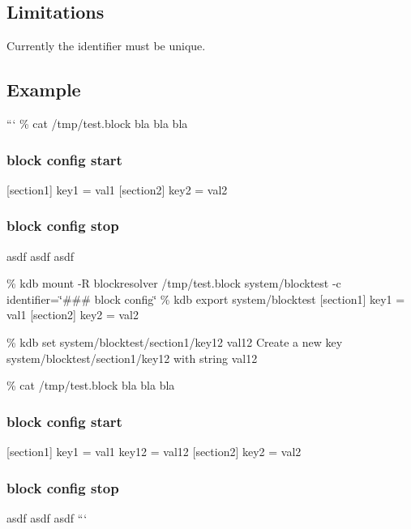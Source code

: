\subsection*{Limitations}

Currently the identifier must be unique.

\subsection*{Example}

``` \% cat /tmp/test.block bla bla bla \subsubsection*{block config start}

\mbox{[}section1\mbox{]} key1 = val1 \mbox{[}section2\mbox{]} key2 = val2 \subsubsection*{block config stop}

asdf asdf asdf

\% kdb mount -\/\+R blockresolver /tmp/test.block system/blocktest -\/c identifier=\char`\"{}\#\#\# block config\char`\"{} \% kdb export system/blocktest \mbox{[}section1\mbox{]} key1 = val1 \mbox{[}section2\mbox{]} key2 = val2

\% kdb set system/blocktest/section1/key12 val12 Create a new key system/blocktest/section1/key12 with string val12

\% cat /tmp/test.block bla bla bla \subsubsection*{block config start}

\mbox{[}section1\mbox{]} key1 = val1 key12 = val12 \mbox{[}section2\mbox{]} key2 = val2 \subsubsection*{block config stop}

asdf asdf asdf ``` 